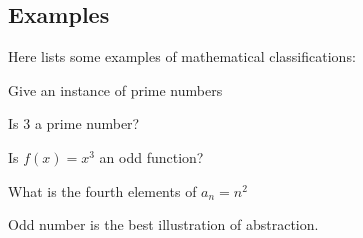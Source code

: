 \subsection*{Examples}
Here lists some examples of mathematical classifications:

\begin{example}
  Give an instance of prime numbers
\end{example}

\begin{example}
  Is 3 a prime number?
\end{example}

\begin{example}
  Is $f(x) = x^3$ an odd function?
\end{example}

\begin{example}
  What is the fourth elements of $a_n = n^2$
\end{example}

Odd number is the best illustration of abstraction.
